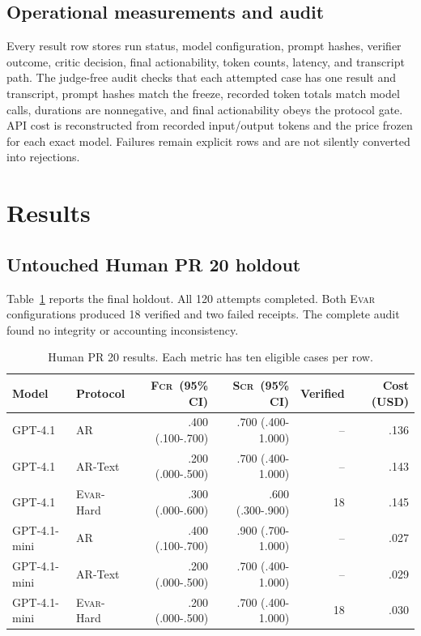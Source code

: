 \documentclass[acmsmall,screen,review,anonymous]{acmart}
\newcommand{\evar}{\textsc{Evar}\xspace}
\newcommand{\fcr}{\textsc{Fcr}\xspace}
\newcommand{\scr}{\textsc{Scr}\xspace}
\begin{document}
\subsection{Operational measurements and audit}

Every result row stores run status, model configuration, prompt hashes, verifier outcome, critic decision, final actionability, token counts, latency, and transcript path. The judge-free audit checks that each attempted case has one result and transcript, prompt hashes match the freeze, recorded token totals match model calls, durations are nonnegative, and final actionability obeys the protocol gate. API cost is reconstructed from recorded input/output tokens and the price frozen for each exact model. Failures remain explicit rows and are not silently converted into rejections.

\section{Results}

\subsection{Untouched Human PR 20 holdout}

Table~\ref{tab:human} reports the final holdout. All 120 attempts completed. Both \evar configurations produced 18 verified and two failed receipts. The complete audit found no integrity or accounting inconsistency.

\begin{table}[h]
\centering
\caption{Human PR 20 results. Each metric has ten eligible cases per row.}
\label{tab:human}
\small
\begin{tabular}{@{}llrrrr@{}}
\toprule
Model & Protocol & \fcr\ (95\% CI) & \scr\ (95\% CI) & Verified & Cost (USD) \\
\midrule
GPT-4.1 & AR & .400 (.100-.700) & .700 (.400-1.000) & -- & .136 \\
GPT-4.1 & AR-Text & .200 (.000-.500) & .700 (.400-1.000) & -- & .143 \\
GPT-4.1 & \evar-Hard & .300 (.000-.600) & .600 (.300-.900) & 18 & .145 \\
GPT-4.1-mini & AR & .400 (.100-.700) & .900 (.700-1.000) & -- & .027 \\
GPT-4.1-mini & AR-Text & .200 (.000-.500) & .700 (.400-1.000) & -- & .029 \\
GPT-4.1-mini & \evar-Hard & .200 (.000-.500) & .700 (.400-1.000) & 18 & .030 \\
\bottomrule
\end{tabular}
\end{table}
\end{document}
